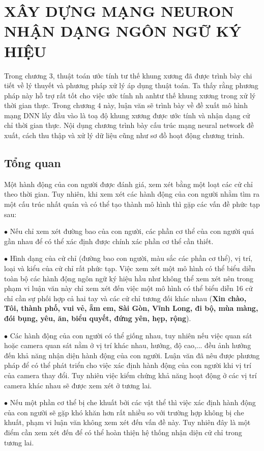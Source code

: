 \chapter{XÂY DỰNG MẠNG NEURON NHẬN DẠNG NGÔN NGỮ KÝ HIỆU}
\label{s:DNN}
Trong chương 3, thuật toán ước tính tư thế khung xương đã được trình bày chi tiết về lý thuyết và phương pháp xử lý áp dụng thuật toán. Ta thấy rằng phương pháp này hỗ trợ rất tốt cho việc ước tính nh anhtư thế khung xương trong xử lý thời gian thực. Trong chương 4 này, luận văn sẽ trình bày về đề xuất mô hình mạng DNN lấy đầu vào là toạ độ khung xương được ước tính và nhận dạng cử chỉ thời gian thực. Nội dụng chương trình bày cấu trúc mạng neural network đề xuất, cách thu thập và xử lý dữ liệu cũng như sơ đồ hoạt động chương trinh.
\section{Tổng quan}
Một hành động của con người được đánh giá, xem xét bằng một loạt các cử chỉ theo thời gian. Tuy nhiên, khi xem xét các hành động của con người nhằm tìm ra một cấu trúc nhất quán và có thể tạo thành mô hình thì gặp các vấn đề phức tạp sau:

$\bullet$ Nếu chỉ xem xét đường bao của con người, các phần cơ thể của con người quá gần nhau để có thể xác định được chính xác phần cơ thể cần thiết.

$\bullet$ Hình dạng của cử chỉ (đường bao con người, màu sắc các phần cơ thể), vị trí, loại và kiểu của cử chỉ rất phức tạp. Việc xem xét một mô hình có thể biểu diễn toàn bộ các hành động ngôn ngữ ký hiệu hầu như không thể xem xét nên trong phạm vi luận văn này chỉ xem xét đến việc một mô hình có thể biểu diễn 16 cử chỉ cần sự phối hợp cả hai tay và các cử chỉ tương đối khác nhau (\textbf{Xin chào, Tôi, thành phố, vui vẻ, ẵm em, Sài Gòn, Vĩnh Long, đi bộ, mùa màng, đói bụng, yêu, ăn, biểu quyết, đứng yên, hẹp, rộng}).

$\bullet$ Các hành động của con người có thể giống nhau, tuy nhiên nếu việc quan sát hoặc camera quan sát nằm ở vị trí khác nhau, hướng, độ cao,... đều ảnh hưởng đến khả năng nhận diện hành động của con người. Luận văn đã nêu được phương pháp để có thể phát triển cho việc xác định hành động của con người khi vị trí của camera thay đổi. Tuy nhiên việc kiểm chứng khả năng hoạt động ở các vị trí camera khác nhau sẽ được xem xét ở tương lai.

$\bullet$ Nếu một phần cơ thể bị che khuất bởi các vật thể thì việc xác định hành động của con người sẽ gặp khó khăn hơn rất nhiều so với trường hợp không bị che khuất, phạm vi luận văn không xem xét đến vấn đề này. Tuy nhiên đây là một điểm cần xem xét đến để có thể hoàn thiện hệ thống nhận diện cử chỉ trong tương lai.
